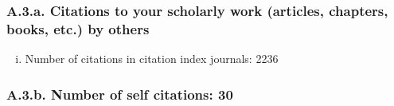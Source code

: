 
\subsubsection*{A.3.a. Citations to your scholarly work (articles, chapters, books, etc.) by others}

\begin{enumerate}[i)]

\item  Number of citations in citation index journals:	2236

\end{enumerate}

\subsubsection*{A.3.b. Number of self citations: 30} 


